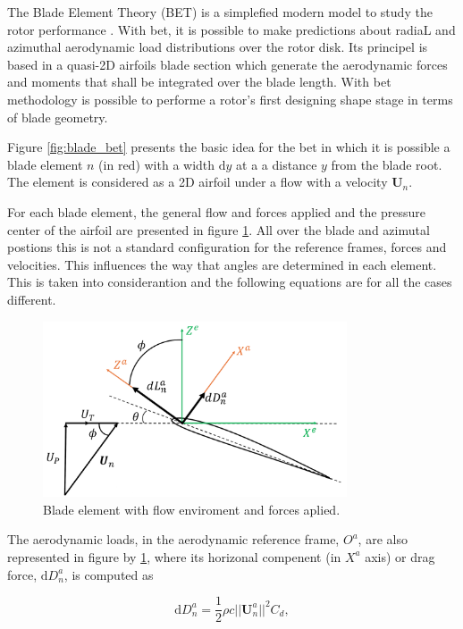The Blade Element Theory (BET) is a simplefied modern model to study the rotor performance \cite{leishman_principles_2006}. With \gls{bet}, it is possible to make predictions about radiaL and azimuthal aerodynamic load distributions over the rotor disk. Its principel is based in a quasi-2D airfoils blade section which generate the aerodynamic forces and moments that shall be integrated over the blade length. With \gls{bet} methodology is possible to performe a rotor's first designing shape stage in terms of blade geometry.

Figure \ref{fig:blade_bet} presents the basic idea for the \gls{bet} in which it is possible a blade element $n$ (in red) with a width $\mathrm{d}y$ at a a distance $y$ from the blade root. The element is considered as a 2D airfoil under a flow with a velocity $\mathbf{U}_n$.

For each blade element, the general flow and forces applied and the pressure center of the airfoil are presented in figure \ref{fig:element_bet}. All over the blade and azimutal postions this is not a standard configuration for the reference frames, forces and velocities. This influences the way that angles are determined in each element. This is taken into considerantion and the following equations are for all the cases different.


\begin{figure}[!htb]
    \centering
    \includegraphics[width=9cm]{Figures/background/bet/element.png}
    \caption{Blade element with flow enviroment and forces aplied.}
    \label{fig:element_bet}
\end{figure}




The aerodynamic loads, in the aerodynamic reference frame, $O^a$, are also represented in figure by \ref{fig:element_bet}, where its horizonal compenent (in $X^a$ axis) or drag force, $\mathrm{d}D_n^a$, is computed as

\begin{equation}
    \mathrm{d}D^a_n = \frac{1}{2} \rho c ||\mathbf{U}^a_n||^2 C_d,
    \label{eq:drag_element}
\end{equation}

